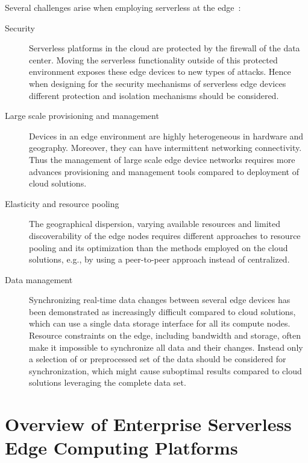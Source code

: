 \documentclass[article]{aaltoseries}
\newcommand{\todonotes}[2]{\todo[inline,color={#1}]{#2}}
\newcommand{\note}[1]{\todonotes{green!20!white}{#1}}
\begin{document}
Several challenges arise when employing serverless at the edge~\cite{glikson_deviceless_2017, nastic_serverless_2017}:
\begin{description}
    \item[Security] 
    Serverless platforms in the cloud are protected by the firewall of the data center.
    Moving the serverless functionality outside of this protected environment exposes these edge devices to new types of attacks. 
    Hence when designing for the security mechanisms of serverless edge devices different protection and isolation mechanisms should be considered.
    \item[Large scale provisioning and management] Devices in an edge environment are highly heterogeneous in hardware and geography. Moreover, they can have intermittent networking connectivity. Thus the management of large scale edge device networks requires more advances provisioning and management tools compared to deployment of cloud solutions.
    \item[Elasticity and resource pooling] The geographical dispersion, varying available resources and limited discoverability of the edge nodes requires different approaches to resource pooling and its optimization than the methods employed on the cloud solutions, e.g., by using a peer-to-peer approach instead of centralized.
    \item[Data management] Synchronizing real-time data changes between several edge devices has been demonstrated as increasingly difficult compared to cloud solutions, which can use a single data storage interface for all its compute nodes.
    Resource constraints on the edge, including bandwidth and storage, often make it impossible to synchronize all data and their changes.
    Instead only a selection of or preprocessed set of the data should be considered for synchronization, which might cause suboptimal results compared to cloud solutions leveraging the complete data set.
\end{description}

\section{Overview of Enterprise Serverless Edge Computing Platforms}\label{sec:overview}
\end{document}
